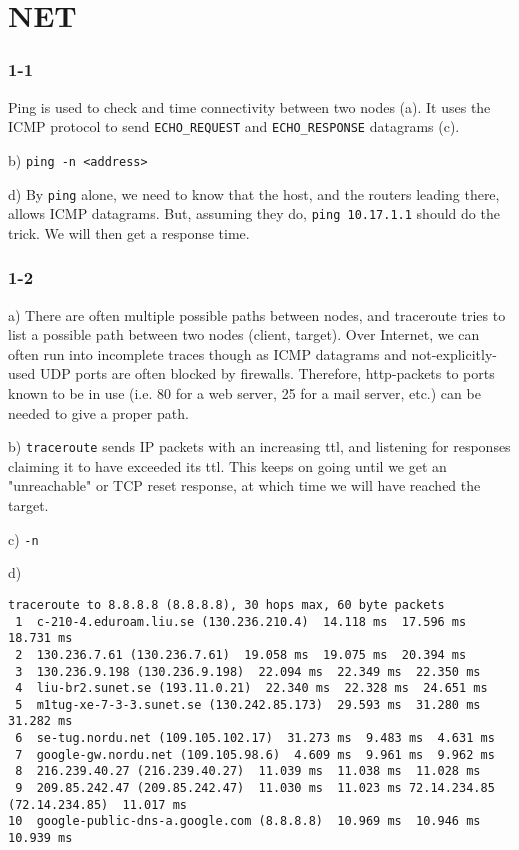 \chapter{NET}
\subsection{1-1}
Ping is used to check and time connectivity between two nodes (a). It uses the ICMP protocol to send \verb=ECHO_REQUEST= and \verb=ECHO_RESPONSE= datagrams (c).

b) \verb=ping -n <address>=

d) By \verb=ping= alone, we need to know that the host, and the routers leading there, allows ICMP datagrams. But, assuming they do,
\verb=ping 10.17.1.1= should do the trick. We will then get a response time.

\subsection{1-2}
a) There are often multiple possible paths between nodes, and traceroute tries to list a possible path between two nodes (client, target). Over Internet, we can often run into incomplete traces though as ICMP datagrams and not-explicitly-used UDP ports are often blocked by firewalls. Therefore, http-packets to ports known to be in use (i.e. 80 for a web server, 25 for a mail server, etc.) can be needed to give a proper path.

b) \verb=traceroute= sends IP packets with an increasing ttl, and listening for responses claiming it to have exceeded its ttl. This keeps on going until we get an "unreachable" or TCP reset response, at which time we will have reached the target.

c) \verb=-n=

d) \begin{verbatim}traceroute to 8.8.8.8 (8.8.8.8), 30 hops max, 60 byte packets
 1  c-210-4.eduroam.liu.se (130.236.210.4)  14.118 ms  17.596 ms  18.731 ms
 2  130.236.7.61 (130.236.7.61)  19.058 ms  19.075 ms  20.394 ms
 3  130.236.9.198 (130.236.9.198)  22.094 ms  22.349 ms  22.350 ms
 4  liu-br2.sunet.se (193.11.0.21)  22.340 ms  22.328 ms  24.651 ms
 5  m1tug-xe-7-3-3.sunet.se (130.242.85.173)  29.593 ms  31.280 ms  31.282 ms
 6  se-tug.nordu.net (109.105.102.17)  31.273 ms  9.483 ms  4.631 ms
 7  google-gw.nordu.net (109.105.98.6)  4.609 ms  9.961 ms  9.962 ms
 8  216.239.40.27 (216.239.40.27)  11.039 ms  11.038 ms  11.028 ms
 9  209.85.242.47 (209.85.242.47)  11.030 ms  11.023 ms 72.14.234.85 (72.14.234.85)  11.017 ms
10  google-public-dns-a.google.com (8.8.8.8)  10.969 ms  10.946 ms  10.939 ms
\end{verbatim}


